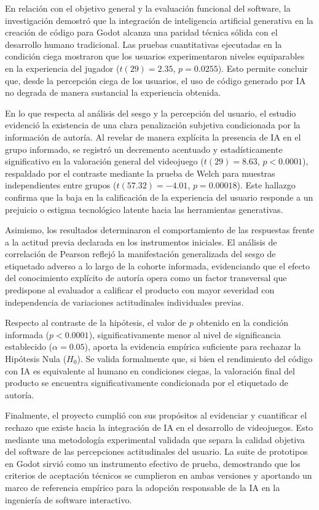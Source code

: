 En relación con el objetivo general y la evaluación funcional del software, la investigación demostró que la integración de inteligencia artificial generativa en la creación de código para Godot alcanza una paridad técnica sólida con el desarrollo humano tradicional. Las pruebas cuantitativas ejecutadas en la condición ciega mostraron que los usuarios experimentaron niveles equiparables en la experiencia del jugador ($t(29) = 2.35$, $p = 0.0255$). Esto permite concluir que, desde la percepción ciega de los usuarios, el uso de código generado por IA no degrada de manera sustancial la experiencia obtenida.

En lo que respecta al análisis del sesgo y la percepción del usuario, el estudio evidenció la existencia de una clara penalización subjetiva condicionada por la información de autoría. Al revelar de manera explícita la presencia de IA en el grupo informado, se registró un decremento acentuado y estadísticamente significativo en la valoración general del videojuego ($t(29) = 8.63$, $p < 0.0001$), respaldado por el contraste mediante la prueba de Welch para muestras independientes entre grupos ($t(57.32) = -4.01$, $p = 0.00018$). Este hallazgo confirma que la baja en la calificación de la experiencia del usuario responde a un prejuicio o estigma tecnológico latente hacia las herramientas generativas.

Asimismo, los resultados determinaron el comportamiento de las respuestas frente a la actitud previa declarada en los instrumentos iniciales. El análisis de correlación de Pearson reflejó la manifestación generalizada del sesgo de etiquetado adverso a lo largo de la cohorte informada, evidenciando que el efecto del conocimiento explícito de autoría opera como un factor transversal que predispone al evaluador a calificar el producto con mayor severidad con independencia de variaciones actitudinales individuales previas.

Respecto al contraste de la hipótesis, el valor de $p$ obtenido en la condición informada ($p < 0.0001$), significativamente menor al nivel de significancia establecido ($\alpha = 0.05$), aporta la evidencia empírica suficiente para rechazar la Hipótesis Nula ($H_0$). Se valida formalmente que, si bien el rendimiento del código con IA es equivalente al humano en condiciones ciegas, la valoración final del producto se encuentra significativamente condicionada por el etiquetado de autoría.

Finalmente, el proyecto cumplió con sus propósitos al evidenciar y cuantificar el rechazo que existe hacia la integración de IA en el desarrollo de videojuegos. Esto mediante una metodología experimental validada que separa la calidad objetiva del software de las percepciones actitudinales del usuario. La suite de prototipos en Godot sirvió como un instrumento efectivo de prueba, demostrando que los criterios de aceptación técnicos se cumplieron en ambas versiones y aportando un marco de referencia empírico para la adopción responsable de la IA en la ingeniería de software interactivo.